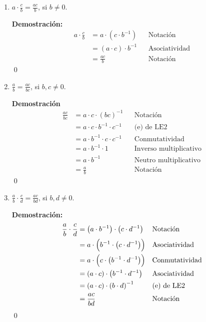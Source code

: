 \documentclass[11pt]{article}
\begin{document}
\begin{enumerate}[label=\alph*)]
    \item $a \cdot \frac{c}{b} = \frac{ac}{b}$, si $b \neq 0$.
    
    \textbf{Demostración:} \begin{align*}
        a \cdot \frac{c}{b} &= a \cdot \left( c \cdot b^{-1} \right) && \text{Notación}\\
        &= \left( a \cdot c \right) \cdot b^{-1} && \text{Asociatividad}\\
        &= \frac{ac}{b} && \text{Notación}
    \end{align*} \qed
    
    \item $\frac{a}{b} = \frac{ac}{bc}$, si $b,c \neq 0$.
    
    \textbf{Demostración}\begin{align*}
        \frac{ac}{bc} &= a \cdot c \cdot \left( bc \right)^{-1} && \text{Notación}\\
        &= a \cdot c \cdot b^{-1} \cdot c^{-1} && \text{(e) de LE2}\\
        &= a \cdot b^{-1} \cdot c \cdot c^{-1} && \text{Conmutatividad}\\
        &= a \cdot b^{-1} \cdot 1 && \text{Inverso multiplicativo}\\
        &= a \cdot b^{-1} && \text{Neutro multiplicativo}\\
        &= \frac{a}{b} && \text{Notación}
    \end{align*}\qed

    \item $\frac{a}{b} \cdot \frac{c}{d} = \frac{ac}{bd}$, si $b, d \neq 0$.
    
    \textbf{Demostración:}\begin{align*}
        \frac{a}{b} \cdot \frac{c}{d} &= \left( a \cdot b^{-1} \right) \cdot \left( c \cdot d^{-1} \right) && \text{Notación}\\
            &= a \cdot \Bigl( b^{-1} \cdot \left( c \cdot d^{-1} \right) \Bigr) && \text{Asociatividad}\\
                &= a \cdot \Bigl( c \cdot \left( b^{-1} \cdot d^{-1} \right) \Bigr) && \text{Conmutatividad}\\
        &= \left( a \cdot c \right) \cdot \left( b^{-1} \cdot d^{-1} \right) && \text{Asociatividad}\\
        &= \left( a \cdot c \right) \cdot \left( b \cdot d \right)^{-1} && \text{(e) de LE2}\\
        &= \frac{ac}{bd} && \text{Notación}
    \end{align*}\qed
    

\end{enumerate}
\end{document}
